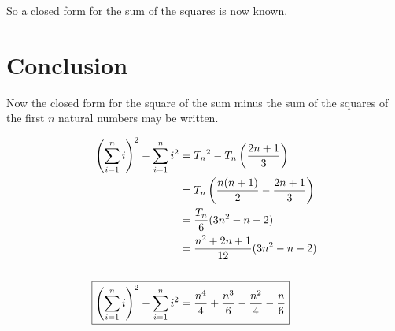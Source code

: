 \documentclass[final,letterpaper]{article}
\begin{document}
So a closed form for the sum of the squares is now known.

\clearpage
\section{Conclusion}

Now the closed form for the square of the sum minus the sum of the squares of
the first $n$ natural numbers may be written.

\begin{align*}
	{\left(\sum_{i=1}^{n}{i}\right)}^2 - \sum_{i=1}^{n}{i^2}
	&= {T_n}^2 - T_n\left(\frac{2n + 1}{3}\right) \\
	&= T_n\left(\frac{n(n+1)}{2} - \frac{2n + 1}{3}\right) \\
	&= \frac{T_n}{6}(3n^2 - n - 2) \\
	&= \frac{n^2 + 2n + 1}{12}(3n^2 - n - 2) \\
	\\
	\Aboxed{%
		{\left(\sum_{i=1}^{n}{i}\right)}^2 - \sum_{i=1}^{n}{i^2}
		&= \frac{n^4}{4} + \frac{n^3}{6} - \frac{n^2}{4} - \frac{n}{6}
	}
\end{align*}
\end{document}
